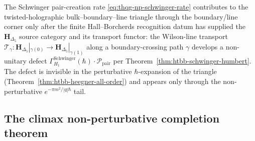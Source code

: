 \begin{remark}
\label{rem:thqg-np-schwinger-corner}
The Schwinger pair-creation rate
\eqref{eq:thqg-np-schwinger-rate} contributes to the
twisted-holographic bulk--boundary--line triangle through the
boundary/line corner only after the finite Hall--Borcherds recognition
datum has supplied the $\mathbf{H}_{\Delta_5}$ source category and its
transport functor: the Wilson-line transport
$\mathcal{T}_\gamma\colon \mathbf{H}_{\Delta_5}|_{\gamma(0)}\to
\mathbf{H}_{\Delta_5}|_{\gamma(1)}$ along a boundary-crossing path
$\gamma$ develops a non-unitary defect
$\Gamma^{\mathrm{Schwinger}}_{H_1}(\hbar)\cdot\mathcal{P}_{\mathrm{pair}}$
per Theorem~\ref{thm:htbb-schwinger-humbert}. The defect is invisible
in the perturbative $\hbar$-expansion of the triangle
(Theorem~\ref{thm:htbb-heegner-all-order}) and appears only through
the non-perturbative $e^{-\pi m^2/|q|\hbar}$ tail.
\end{remark}

\subsection{The climax non-perturbative completion theorem}
\label{subsec:thqg-np-climax-theorem}

